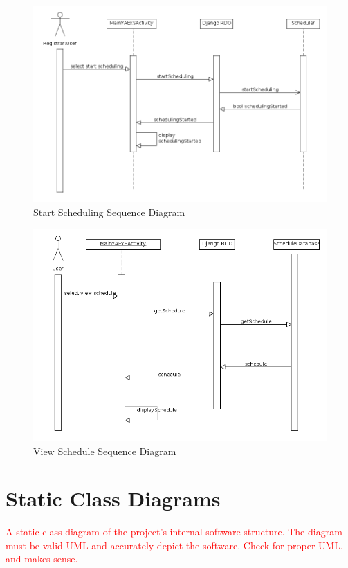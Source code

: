 \documentclass[11pt]{article}
\begin{document}
\begin{figure}
	\centering
		\includegraphics[width = \textwidth]{startSchedulingSequence.png}
	\caption{Start Scheduling Sequence Diagram}
	\label{fig:startSeq}
\end{figure}


\begin{figure}
	\centering
		\includegraphics[width = \textwidth]{viewScheduleSequence.png}
	\caption{View Schedule Sequence Diagram}
	\label{fig:viewSeq}
\end{figure}



\section*{Static Class Diagrams}  %
\textcolor{red}{
A static class diagram of the project's internal software structure. The diagram must be valid UML and accurately depict the software.  Check for proper UML, and makes sense.}
\end{document}
